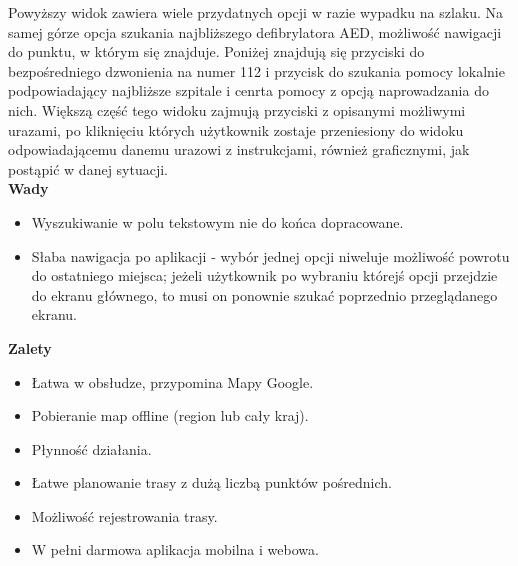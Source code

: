 Powyższy widok zawiera wiele przydatnych opcji w razie wypadku na szlaku. Na samej górze opcja szukania najbliższego defibrylatora AED, możliwość nawigacji do punktu, w którym się znajduje. Poniżej znajdują się przyciski do bezpośredniego dzwonienia na numer 112 i przycisk do szukania pomocy lokalnie podpowiadający najbliższe szpitale i cenrta pomocy z opcją naprowadzania do nich. Większą część tego widoku zajmują przyciski z opisanymi możliwymi urazami, po kliknięciu których użytkownik zostaje przeniesiony do widoku odpowiadającemu danemu urazowi z instrukcjami, również graficznymi, jak postąpić w danej sytuacji.
\\

\noindent
\textbf{Wady}
\begin{itemize}
    \item Wyszukiwanie w polu tekstowym nie do końca dopracowane.
    \item Słaba nawigacja po aplikacji - wybór jednej opcji niweluje możliwość powrotu do ostatniego miejsca; jeżeli użytkownik po wybraniu którejś opcji przejdzie do ekranu głównego, to musi on ponownie szukać poprzednio przeglądanego ekranu.
\end{itemize}
\textbf{Zalety}
\begin{itemize}
    \item Łatwa w obsłudze, przypomina Mapy Google.
    \item Pobieranie map offline (region lub cały kraj).
    \item Płynność działania.
    \item Łatwe planowanie trasy z dużą liczbą punktów pośrednich.
    \item Możliwość rejestrowania trasy.
    \item W pełni darmowa aplikacja mobilna i webowa.
\end{itemize}



